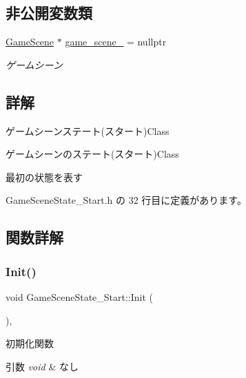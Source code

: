 \subsection*{非公開変数類}
\begin{DoxyCompactItemize}
\item 
\mbox{\hyperlink{class_game_scene}{Game\+Scene}} $\ast$ \mbox{\hyperlink{class_game_scene_state___start_af9389c7c8496419a6a4a3d3339acd94f}{game\+\_\+scene\+\_\+}} = nullptr
\begin{DoxyCompactList}\small\item\em ゲームシーン \end{DoxyCompactList}\end{DoxyCompactItemize}


\subsection{詳解}
ゲームシーンステート(スタート)Class 

ゲームシーンのステート(スタート)Class

最初の状態を表す 

 Game\+Scene\+State\+\_\+\+Start.\+h の 32 行目に定義があります。



\subsection{関数詳解}
\mbox{\label{class_game_scene_state___start_ae921c57f349fbb2f00a197d40a3404b7}} 
\subsubsection{\texorpdfstring{Init()}{Init()}}
{\footnotesize\ttfamily void Game\+Scene\+State\+\_\+\+Start\+::\+Init (\begin{DoxyParamCaption}{ }\end{DoxyParamCaption})\hspace{0.3cm}{\ttfamily [override]}, {\ttfamily [virtual]}}



初期化関数 


\begin{DoxyParams}{引数}
{\em void} & なし \\
\hline
\end{DoxyParams}

